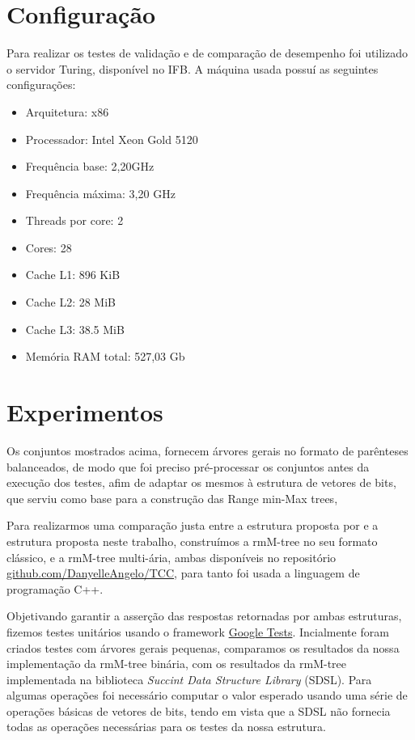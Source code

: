 \section{Configuração}\label{sec:configuracao}
Para realizar os testes de validação e de comparação de desempenho foi utilizado o servidor Turing, disponível no IFB. A máquina usada possuí as seguintes configurações:
\begin{itemize}
    \item Arquitetura: x86
    \item Processador: Intel Xeon Gold 5120
    \item Frequência base: 2,20GHz
    \item Frequência máxima: 3,20 GHz
    \item Threads por core: 2
    \item Cores: 28
    \item Cache L1: 896 KiB
    \item Cache L2: 28 MiB
    \item Cache L3: 38.5 MiB
    \item Memória RAM total: 527,03 Gb
\end{itemize}

\section{Experimentos}\label{sec:experimentos}

Os conjuntos mostrados acima, fornecem árvores gerais no formato de parênteses balanceados, de modo que foi preciso
pré-processar os conjuntos antes da execução dos testes, afim de adaptar os mesmos à estrutura de vetores de bits, que serviu como base para a
construção das Range min-Max trees,


Para realizarmos uma comparação justa entre a estrutura proposta por \citet{paper-fully-functinal-succint-trees} e a estrutura proposta neste trabalho, 
construímos a rmM-tree no seu formato clássico, e a rmM-tree multi-ária, ambas disponíveis no repositório \href{https://github.com/DanyelleAngelo/TCC/tree/master/Implementation}{github.com/DanyelleAngelo/TCC}, 
para tanto foi usada a linguagem de programação C++.

Objetivando garantir a asserção das respostas retornadas por ambas estruturas, fizemos testes unitários usando o framework
\href{https://github.com/google/googletest}{Google Tests}. Incialmente foram criados testes com árvores gerais pequenas, 
comparamos os resultados da nossa implementação da rmM-tree binária, com os resultados da rmM-tree implementada na biblioteca \textit{Succint Data
Structure Library} (SDSL). Para algumas operações foi necessário computar o valor esperado usando uma série de operações básicas de vetores de bits, tendo em vista 
que a SDSL não fornecia todas as operações necessárias para os testes da nossa estrutura.

